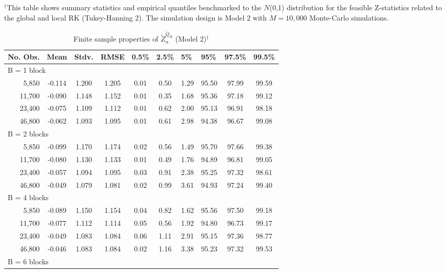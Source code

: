 \documentclass[11pt]{article}
\numberwithin{equation}{section}
\theoremstyle{plain}
\theoremstyle{remark}
\begin{document}
\begin{table}[]
\begin{tabular}{@{}rccccccccc@{}}
\end{tabular}

\scriptsize $^\dag$This table shows summary statistics and empirical quantiles benchmarked to the $N$(0,1) distribution for the feasible Z-statistics related to the global and local RK (Tukey-Hanning 2). The simulation design is Model 2 with $M = 10,000$ Monte-Carlo simulations. 
\end{table}


\begin{table}[]
\centering
\caption{Finite sample properties of $\tilde{Z}_n^{\tilde{Q}_B}$ (Model 2)$^\dag$}
\label{stdQMLEfeasible}
\begin{tabular}{@{}rccccccccc@{}}
\toprule
\toprule
\multicolumn{1}{l}{No. Obs.} & \multicolumn{1}{l}{Mean} & \multicolumn{1}{l}{Stdv.} & \multicolumn{1}{l}{RMSE} & \multicolumn{1}{l}{0.5\%} & \multicolumn{1}{l}{2.5\%} & \multicolumn{1}{l}{5\%} & \multicolumn{1}{l}{95\%} & \multicolumn{1}{l}{97.5\%} & \multicolumn{1}{l}{99.5\%} \\ \toprule
\multicolumn{10}{l}{B = 1 block} \\
5,850 &-0.114&1.200&1.205&0.01&0.50&1.29&95.50&97.99&99.59
\\
11,700 &-0.090&1.148&1.152&0.01&0.35&1.68&95.36&97.18&99.12
\\
23,400 &-0.075&1.109&1.112&0.01&0.62&2.00&95.13&96.91&98.18\\
46,800 &-0.062&1.093&1.095&0.01&0.61&2.98&94.38&96.67&99.08
\\
\multicolumn{10}{l}{B = 2 blocks} \\
5,850 &-0.099&1.170&1.174&0.02&0.56&1.49&95.70&97.66&99.38
\\
11,700 &-0.080&1.130&1.133&0.01&0.49&1.76&94.89&96.81&99.05\\
23,400 &-0.057&1.094&1.095&0.03&0.91&2.38&95.25&97.32&98.61\\
46,800 &-0.049&1.079&1.081&0.02&0.99&3.61&94.93&97.24&99.40
\\
\multicolumn{10}{l}{B = 4 blocks} \\
5,850 &-0.089&1.150&1.154&0.04&0.82&1.62&95.56&97.50&99.18
\\
11,700 & -0.077&1.112&1.114&0.05&0.56&1.92&94.80&96.73&99.17
\\
23,400 &-0.049&1.083&1.084&0.06&1.11&2.91&95.15&97.36&98.77\\
46,800 &-0.046&1.083&1.084&0.02&1.16&3.38&95.23&97.32&99.53\\
\multicolumn{10}{l}{B = 6 blocks} \\

\end{tabular}
\end{table}
\end{document}
